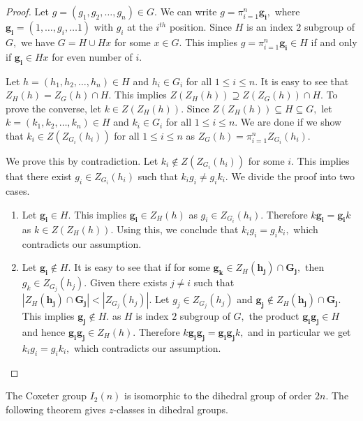 \documentclass[12pt,twoside,reqno]{amsart}
\theoremstyle{definition}
\numberwithin{equation}{section}
\newcommand{\bmf}[1]{\mathbf{#1}}
\begin{document}
\begin{proof}
  Let $g= (g_1, g_2, \dots , g_n)\in G. $ We can write $g = \pi_{i=1}^{n}\bmf{g_i}, $ where $\bmf{g_i} = (1,\dots, g_i, \dots 1)$ with $g_i$ at the $i^{th}$ position. Since $H$ is an index $2$ subgroup of $G,$ we have $G= H \cup Hx$ for some $x\in G.$ This implies $g = \pi_{i=1}^{n}\bmf{g_i} \in H $ if and only if $\bmf{g_i}\in Hx$ for even number of $i.$ 

  Let $h = (h_1, h_2, \dots , h_n)\in H$ and $h_i\in G_i$ for all $1\leq i\leq n.$ 
  It is easy to see that $Z_H(h)=Z_G(h)\cap H.$ This implies $Z(Z_H(h))\supseteq Z(Z_G(h))\cap H.$ To prove the converse,  let $k\in Z(Z_H(h)).$ Since $Z(Z_H(h))\subseteq H\subseteq G,$ let $k = (k_1, k_2, \dots , k_n)\in H$ and $k_i\in G_i$ for all $1\leq i\leq n.$  We are done if we show that $k_i \in Z(Z_{G_i}(h_i))$ for all $1\leq i\leq n$ as $Z_G(h)= \pi_{i=1}^{n} Z_{G_i}(h_i).$
  
  We prove this by contradiction. Let $k_i \notin Z(Z_{G_i}(h_i))$ for some $i.$ This implies that there exist $g_i \in Z_{G_i}(h_i)$ such that $k_ig_i\neq g_ik_i.$ We divide the proof into two cases.
  
 \begin{enumerate}
  \item Let $\bmf{g_i}\in H.$ This implies $\bmf{g_i} \in Z_H(h)$ as $g_i \in Z_{G_i}(h_i).$ Therefore $k\bmf{g_i}=\bmf{g_i}k$ as $k\in Z(Z_H(h)).$ Using this, we conclude that $k_ig_i= g_ik_i,$ which contradicts our assumption.
  \item Let $\bmf{g_i}\notin H.$ It is easy to see that if for some $\bmf{g_k} \in Z_H(\bmf{h_j})\cap \bmf{G_j}, $ then $g_k \in Z_{G_j}(h_j).$ Given there exists $j\neq i$ such that $|Z_H(\bmf{h_j})\cap \bmf{G_j} | < |Z_{G_j}(h_j)|.$ Let $g_j \in Z_{G_j}(h_j)$ and $\bmf{g_j}\notin  Z_H(\bmf{h_j})\cap \bmf{G_j}.$ This implies $\bmf{g_j} \notin H.$ as $H$ is index $2$ subgroup of $G,$ the product $\bmf{g_i}\bmf{g_j}\in H$ and hence $\bmf{g_i}\bmf{g_j}\in Z_H(h).$ Therefore $k\bmf{g_i}\bmf{g_j}=\bmf{g_i}\bmf{g_j}k,$ and in particular we get $k_ig_i= g_ik_i,$ which contradicts our assumption.
 \end{enumerate}
\end{proof}

The Coxeter group $I_2(n)$ is isomorphic to the dihedral group of order $2n.$ The following theorem gives $z$-classes in dihedral groups.
\end{document}
